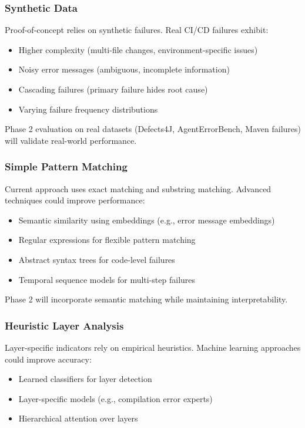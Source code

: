 \documentclass[11pt]{article}
\begin{document}
\subsubsection{Synthetic Data}

Proof-of-concept relies on synthetic failures. Real CI/CD failures exhibit:
\begin{itemize}
    \item Higher complexity (multi-file changes, environment-specific issues)
    \item Noisy error messages (ambiguous, incomplete information)
    \item Cascading failures (primary failure hides root cause)
    \item Varying failure frequency distributions
\end{itemize}

Phase 2 evaluation on real datasets (Defects4J, AgentErrorBench, Maven failures) will validate real-world performance.

\subsubsection{Simple Pattern Matching}

Current approach uses exact matching and substring matching. Advanced techniques could improve performance:
\begin{itemize}
    \item Semantic similarity using embeddings (e.g., error message embeddings)
    \item Regular expressions for flexible pattern matching
    \item Abstract syntax trees for code-level failures
    \item Temporal sequence models for multi-step failures
\end{itemize}

Phase 2 will incorporate semantic matching while maintaining interpretability.

\subsubsection{Heuristic Layer Analysis}

Layer-specific indicators rely on empirical heuristics. Machine learning approaches could improve accuracy:
\begin{itemize}
    \item Learned classifiers for layer detection
    \item Layer-specific models (e.g., compilation error experts)
    \item Hierarchical attention over layers
\end{itemize}
\end{document}
